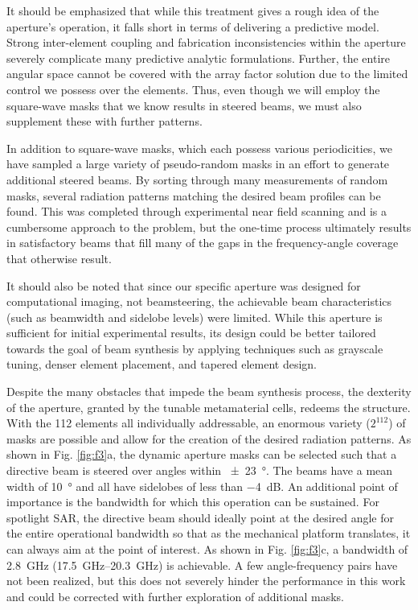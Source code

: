 \documentclass[journal]{IEEEtran}
\begin{document}
It should be emphasized that while this treatment gives a rough idea of the aperture's operation, it falls short in terms of delivering a predictive model. Strong inter-element coupling and fabrication inconsistencies within the aperture severely complicate many predictive analytic formulations. Further, the entire angular space cannot be covered with the array factor solution due to the limited control we possess over the elements. Thus, even though we will employ the square-wave masks that we know results in steered beams, we must also supplement these with further patterns.

In addition to square-wave masks, which each possess various periodicities, we have sampled a large variety of pseudo-random masks in an effort to generate additional steered beams. By sorting through many measurements of random masks, several radiation patterns matching the desired beam profiles can be found. This was completed through experimental near field scanning and is a cumbersome approach to the problem, but the one-time process ultimately results in satisfactory beams that fill many of the gaps in the frequency-angle coverage that otherwise result.

It should also be noted that since our specific aperture was designed for computational imaging, not beamsteering, the achievable beam characteristics (such as beamwidth and sidelobe levels) were limited. While this aperture is sufficient for initial experimental results, its design could be better tailored towards the goal of beam synthesis by applying techniques such as grayscale tuning, denser element placement, and tapered element design.

Despite the many obstacles that impede the beam synthesis process, the dexterity of the aperture, granted by the tunable metamaterial cells, redeems the structure. With the 112 elements all individually addressable, an enormous variety ($2^{112}$) of masks are possible and allow for the creation of the desired radiation patterns. As shown in Fig. \ref{fig:f3}a, the dynamic aperture masks can be selected such that a directive beam is steered over angles within \SI{\pm 23}{\degree}. The beams have a mean width of \SI{10}{\degree} and all have sidelobes of less than \SI{-4}{\dB}. An additional point of importance is the bandwidth for which this operation can be sustained. For spotlight SAR, the directive beam should ideally point at the desired angle for the entire operational bandwidth so that as the mechanical platform translates, it can always aim at the point of interest. As shown in Fig. \ref{fig:f3}c, a bandwidth of \SI{2.8}{\giga\hertz} (\SIrange{17.5}{20.3}{\GHz}) is achievable. A few angle-frequency pairs have not been realized, but this does not severely hinder the performance in this work and could be corrected with further exploration of additional masks.
\end{document}
